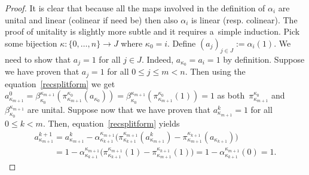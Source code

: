 \begin{proof}
It is clear that because all the maps involved in the def\/inition of $\alpha_i$ are unital and linear (colinear if need
be) then also $\alpha_i$ is linear (resp.
colinear).
The proof of unitality is slightly more subtle and it requires a~simple induction.
Pick some bijection $\kappa:\{0,\ldots,n\}\rightarrow J$ where $\kappa_0=i$.
Def\/ine $(a_j)_{j\in J}:=\alpha_i(1)$.
We need to show that $a_j=1$ for all $j\in J$.
Indeed, $a_{\kappa_0}=a_i=1$ by def\/inition.
Suppose we have proven that $a_j=1$ for all $0\leq j\leq m<n$.
Then using the equation~\eqref{recsplitform} we get
$a^0_{\kappa_{m+1}}=\beta^{\kappa_{m+1}}_{\kappa_0}(\pi^{\kappa_0}_{\kappa_{m+1}}(a_{\kappa_0}))=
\beta^{\kappa_{m+1}}_{\kappa_0}(\pi^{\kappa_0}_{\kappa_{m+1}}(1))=1$ as both~$\pi^{\kappa_0}_{\kappa_{m+1}}$ and~$\beta^{\kappa_{m+1}}_{\kappa_0}$ are unital.
Suppose now that we have proven that $a^k_{\kappa_{m+1}}=1$ for all $0\leq k<m$.
Then, equation~\eqref{recsplitform} yields
\begin{gather*}
a^{k+1}_{\kappa_{m+1}}
=a_{\kappa_{m+1}}^k-\alpha^{\kappa_{m+1}}_{\kappa_{k+1}}
\big(\pi^{\kappa_{m+1}}_{\kappa_{k+1}}(a^k_{\kappa_{m+1}})-\pi^{\kappa_{k+1}}_{\kappa_{m+1}}(a_{\kappa_{k+1}})\big)
\\
\phantom{a^{k+1}_{\kappa_{m+1}}}
 =1 -\alpha^{\kappa_{m+1}}_{\kappa_{k+1}}\big(\pi^{\kappa_{m+1}}_{\kappa_{k+1}}(1)-\pi^{\kappa_{k+1}}_{\kappa_{m+1}}(1)\big)
 =1-\alpha^{\kappa_{m+1}}_{\kappa_{k+1}}(0)
 =1.
\end{gather*}


\end{proof}
